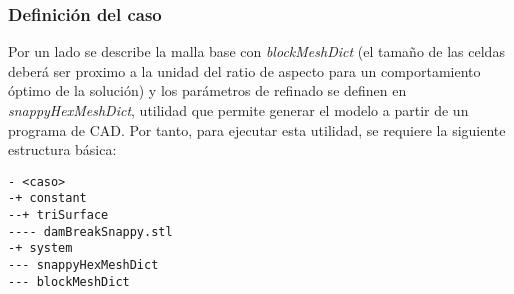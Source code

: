 \subsubsection{Definición del caso}\label{header-n855}

Por un lado se describe la malla base con \emph{blockMeshDict} (el
tamaño de las celdas deberá ser proximo a la unidad del ratio de aspecto
para un comportamiento óptimo de la solución) y los parámetros de
refinado se definen en \emph{snappyHexMeshDict}, utilidad que permite
generar el modelo a partir de un programa de CAD. Por tanto, para
ejecutar esta utilidad, se requiere la siguiente estructura básica:

\begin{verbatim}
- <caso>
-+ constant
--+ triSurface
---- damBreakSnappy.stl
-+ system
--- snappyHexMeshDict
--- blockMeshDict
\end{verbatim}

